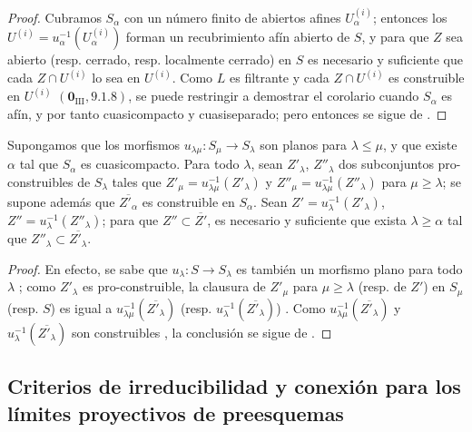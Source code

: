 \begin{proof}
Cubramos $S_\alpha$ con un número finito de abiertos afines $U_\alpha^{(i)}$; entonces los $U^{(i)}=u_\alpha^{-1}(U_\alpha^{(i)})$ forman un recubrimiento afín abierto de $S$, y para que $Z$ sea abierto (resp. cerrado, resp. localmente cerrado) en $S$ es necesario y suficiente que cada $Z\cap U^{(i)}$ lo sea en $U^{(i)}$.
Como $L$ es filtrante y cada $Z\cap U^{(i)}$ es construible en $U^{(i)}$ $(\mathbf{0}_{\mathrm{III}},9.1.8)$, se puede restringir a demostrar el corolario cuando $S_\alpha$ es afín, y por tanto cuasicompacto y cuasiseparado; pero entonces se sigue de .
\end{proof}

\begin{proposition}[8.3.13]
\label{IV.8.3.13-fr}
Supongamos que los morfismos $u_{\lambda\mu}:S_\mu\to S_\lambda$ son planos para $\lambda\leq\mu$, y que existe $\alpha$ tal que $S_\alpha$ es cuasicompacto.
Para todo $\lambda$, sean $Z'_\lambda$, $Z''_\lambda$ dos subconjuntos pro-construibles de $S_\lambda$ tales que $Z'_\mu=u_{\lambda\mu}^{-1}(Z'_\lambda)$ y $Z''_\mu=u_{\lambda\mu}^{-1}(Z''_\lambda)$ para $\mu\geq\lambda$; se supone además que $\overline{Z'_\alpha}$ es construible en $S_\alpha$.
Sean $Z'=u_\lambda^{-1}(Z'_\lambda)$, $Z''=u_\lambda^{-1}(Z''_\lambda)$; para que $Z''\subset\overline{Z'}$, es necesario y suficiente que exista $\lambda\geq\alpha$ tal que $Z''_\lambda\subset\overline{Z'_\lambda}$.
\end{proposition}

\begin{proof}
En efecto, se sabe que $u_\lambda:S\to S_\lambda$ es también un morfismo plano para todo $\lambda$ ; como $Z'_\lambda$ es pro-construible, la clausura de $Z'_\mu$ para $\mu\geq\lambda$ (resp. de $Z'$) en $S_\mu$ (resp. $S$) es igual a $u_{\lambda\mu}^{-1}(\overline{Z'_\lambda})$ (resp. $u_\lambda^{-1}(\overline{Z'_\lambda})$) .
Como $u_{\lambda\mu}^{-1}(\overline{Z'_\lambda})$ y $u_\lambda^{-1}(\overline{Z'_\lambda})$ son construibles , la conclusión se sigue de .
\end{proof}

\subsection{Criterios de irreducibilidad y conexión para los límites proyectivos de preesquemas}
\label{subsection:IV.8.4-fr}

